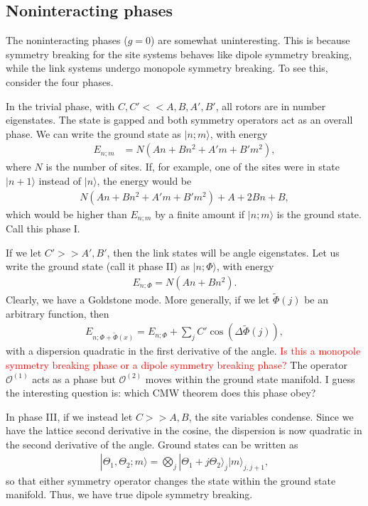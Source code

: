 \documentclass[12pt]{article}
\newcommand{\note}[1]{\textcolor{red}{#1}}
\begin{document}
\subsection{Noninteracting phases}

The noninteracting phases ($g=0$) are somewhat uninteresting. This is because symmetry breaking for the site systems behaves like dipole symmetry breaking, while the link systems undergo monopole symmetry breaking. To see this, consider the four phases.

In the trivial phase, with $C,C'<<A,B,A',B'$, all rotors are in number eigenstates. The state is gapped and both symmetry operators act as an overall phase. We can write the ground state as $|n;m\rangle$, with energy
\begin{align}
E_{n;m} &= N\left(An+Bn^2+A'm+B'm^2\right),
\end{align}
where $N$ is the number of sites. If, for example, one of the sites were in state $|n+1\rangle$ instead of $|n\rangle$, the energy would be 
\begin{align}
N\left(An+Bn^2+A'm+B'm^2\right) + A+2Bn+B,
\end{align}
which would be higher than $E_{n;m}$ by a finite amount if $|n;m\rangle$ is the ground state. Call this phase I.

If we let $C'>>A',B'$, then the link states will be angle eigenstates. Let us write the ground state (call it phase II) as $|n;\Phi\rangle$, with energy
\begin{align}
E_{n;\Phi} = N(An+Bn^2).
\end{align}
Clearly, we have a Goldstone mode. More generally, if we let $\tilde{\Phi}(j)$ be an arbitrary function, then
\begin{align}
E_{n;\Phi+\tilde{\Phi}(x)} = E_{n;\Phi} + \sum_jC' \cos( \Delta \tilde{\Phi}(j)),
\end{align}
with a dispersion quadratic in the first derivative of the angle. \note{Is this a monopole symmetry breaking phase or a dipole symmetry breaking phase?} The operator $\mathcal{O}^{(1)}$ acts as a phase but $\mathcal{O}^{(2)}$ moves within the ground state manifold. I guess the interesting question is: which CMW theorem does this phase obey?

In phase III, if we instead let $C>>A,B$, the site variables condense. Since we have the lattice second derivative in the cosine, the dispersion is now quadratic in the second derivative of the angle. Ground states can be written as 
\begin{align}
|\Theta_1,\Theta_2; m\rangle = \bigotimes_j |\Theta_1 + j\Theta_2\rangle_j |m\rangle_{j,j+1},
\end{align}
so that either symmetry operator changes the state within the ground state manifold. Thus, we have true dipole symmetry breaking.
\end{document}
